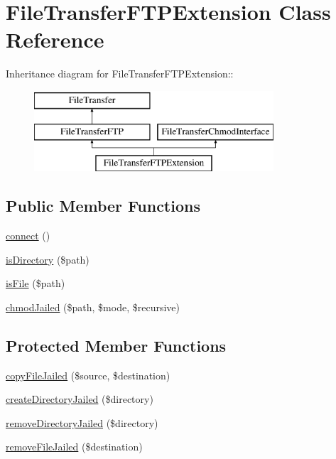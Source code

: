 \hypertarget{classFileTransferFTPExtension}{
\section{FileTransferFTPExtension Class Reference}
\label{classFileTransferFTPExtension}
}
Inheritance diagram for FileTransferFTPExtension::\begin{figure}[H]
\begin{center}
\leavevmode
\includegraphics[height=3cm]{classFileTransferFTPExtension}
\end{center}
\end{figure}
\subsection*{Public Member Functions}
\begin{DoxyCompactItemize}
\item 
\hyperlink{classFileTransferFTPExtension_ad79d4e7e3f1c9800f30edb387e358f22}{connect} ()
\item 
\hyperlink{classFileTransferFTPExtension_a6d067cfbdb848b76fa576c755572777f}{isDirectory} (\$path)
\item 
\hyperlink{classFileTransferFTPExtension_ab480d4c5aa1a5a95419155d6367dee43}{isFile} (\$path)
\item 
\hyperlink{classFileTransferFTPExtension_a7256841ba293ae42126f05a4ab3dfe82}{chmodJailed} (\$path, \$mode, \$recursive)
\end{DoxyCompactItemize}
\subsection*{Protected Member Functions}
\begin{DoxyCompactItemize}
\item 
\hyperlink{classFileTransferFTPExtension_a42ee0199e700e678579e0bd7ea51c534}{copyFileJailed} (\$source, \$destination)
\item 
\hyperlink{classFileTransferFTPExtension_af1114a1f88335b964727c9ac73cc7a27}{createDirectoryJailed} (\$directory)
\item 
\hyperlink{classFileTransferFTPExtension_a2dc94e1f0b02a460914f8c3e8ef47d07}{removeDirectoryJailed} (\$directory)
\item 
\hyperlink{classFileTransferFTPExtension_a60d622a655c4492a569b02d25d2aa376}{removeFileJailed} (\$destination)
\end{DoxyCompactItemize}


